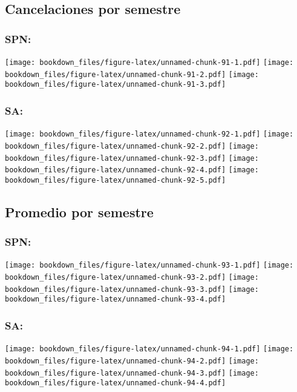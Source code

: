 \documentclass[]{article}
\theoremstyle{definition}
\theoremstyle{definition}
\theoremstyle{definition}
\theoremstyle{remark}
\begin{document}
\subsection{Cancelaciones por
semestre}\label{cancelaciones-por-semestre-1}

\subsubsection{SPN:}\label{spn-2}

\texttt{[image: bookdown\_files/figure-latex/unnamed-chunk-91-1.pdf]}
\texttt{[image: bookdown\_files/figure-latex/unnamed-chunk-91-2.pdf]}
\texttt{[image: bookdown\_files/figure-latex/unnamed-chunk-91-3.pdf]}

\subsubsection{SA:}\label{sa-2}

\texttt{[image: bookdown\_files/figure-latex/unnamed-chunk-92-1.pdf]}
\texttt{[image: bookdown\_files/figure-latex/unnamed-chunk-92-2.pdf]}
\texttt{[image: bookdown\_files/figure-latex/unnamed-chunk-92-3.pdf]}
\texttt{[image: bookdown\_files/figure-latex/unnamed-chunk-92-4.pdf]}
\texttt{[image: bookdown\_files/figure-latex/unnamed-chunk-92-5.pdf]}

\subsection{Promedio por semestre}\label{promedio-por-semestre-1}

\subsubsection{SPN:}\label{spn-3}

\texttt{[image: bookdown\_files/figure-latex/unnamed-chunk-93-1.pdf]}
\texttt{[image: bookdown\_files/figure-latex/unnamed-chunk-93-2.pdf]}
\texttt{[image: bookdown\_files/figure-latex/unnamed-chunk-93-3.pdf]}
\texttt{[image: bookdown\_files/figure-latex/unnamed-chunk-93-4.pdf]}

\subsubsection{SA:}\label{sa-3}

\texttt{[image: bookdown\_files/figure-latex/unnamed-chunk-94-1.pdf]}
\texttt{[image: bookdown\_files/figure-latex/unnamed-chunk-94-2.pdf]}
\texttt{[image: bookdown\_files/figure-latex/unnamed-chunk-94-3.pdf]}
\texttt{[image: bookdown\_files/figure-latex/unnamed-chunk-94-4.pdf]}
\end{document}
